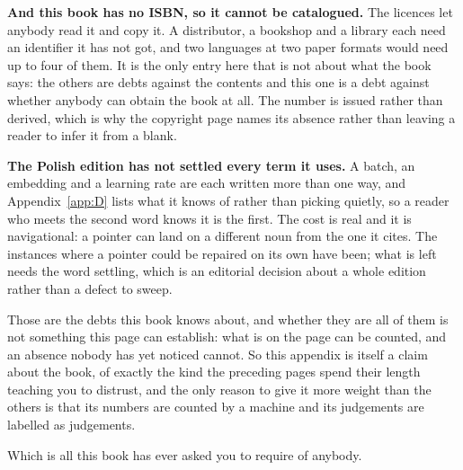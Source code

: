 \medskip
\textbf{And this book has no ISBN, so it cannot be catalogued.} The licences
let anybody read it and copy it. A distributor, a bookshop and a library each
need an identifier it has not got, and two languages at two paper formats
would need up to four of them. It is the only entry here that is not about
what the book says: the others are debts against the contents and this one is
a debt against whether anybody can obtain the book at all. The number is
issued rather than derived, which is why the copyright page names its absence
rather than leaving a reader to infer it from a blank.

\medskip
\textbf{The Polish edition has not settled every term it uses.} A batch, an
embedding and a learning rate are each written more than one way, and
Appendix~\ref{app:D} lists what it knows of rather than picking quietly, so a
reader who meets the second word knows it is the first. The cost is real and
it is navigational: a pointer can land on a different noun from the one it
cites. The instances where a pointer could be repaired on its own have been;
what is left needs the word settling, which is an editorial decision about a
whole edition rather than a defect to sweep.

\medskip
Those are the debts this book knows about, and whether they are all of them
is not something this page can establish: what is on the page can be counted,
and an absence nobody has yet noticed cannot. So this appendix is itself a
claim about the book, of exactly the kind the preceding pages spend their
length teaching you to distrust, and the only reason to give it more weight
than the others is that its numbers are counted by a machine and its
judgements are labelled as judgements.

Which is all this book has ever asked you to require of anybody.
